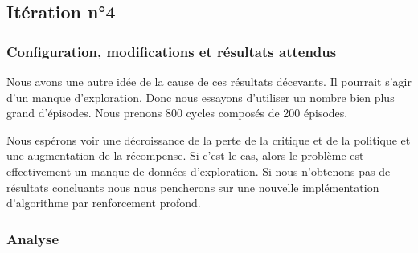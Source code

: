 \subsection{Itération n°4}

\subsubsection{Configuration, modifications et résultats attendus}

Nous avons une autre idée de la cause de ces résultats décevants. Il pourrait s'agir d'un manque d'exploration. Donc nous essayons d'utiliser un nombre bien plus grand d'épisodes. Nous prenons 800 cycles composés de 200 épisodes.

Nous espérons voir une décroissance de la perte de la critique et de la politique et une augmentation de la récompense. Si c'est le cas, alors le problème est effectivement un manque de données d'exploration. Si nous n'obtenons pas de résultats concluants nous nous pencherons sur une nouvelle implémentation d'algorithme par renforcement profond.

\subsubsection{Analyse}

